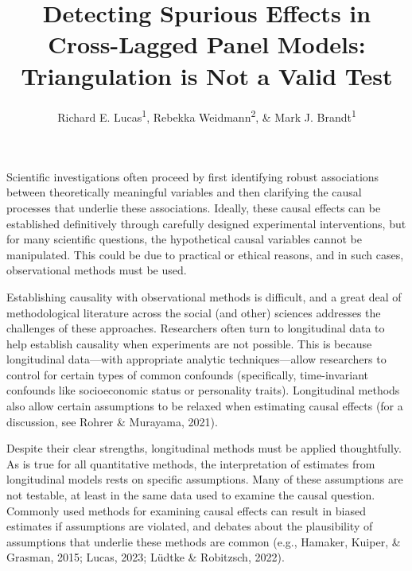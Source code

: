 \documentclass[
  man,mask,floatsintext]{apa6}
\title{Detecting Spurious Effects in Cross-Lagged Panel Models: Triangulation is Not a Valid Test}
\author{Richard E. Lucas\textsuperscript{1}, Rebekka Weidmann\textsuperscript{2}, \& Mark J. Brandt\textsuperscript{1}}
\date{}
\affiliation{\vspace{0.5cm}\textsuperscript{1} Department of Psychology, Michigan State University\\\textsuperscript{2} Department of Psychology, Brigham Young University}
\begin{document}
\maketitle

Scientific investigations often proceed by first identifying robust associations between theoretically meaningful variables and then clarifying the causal processes that underlie these associations. Ideally, these causal effects can be established definitively through carefully designed experimental interventions, but for many scientific questions, the hypothetical causal variables cannot be manipulated. This could be due to practical or ethical reasons, and in such cases, observational methods must be used.

Establishing causality with observational methods is difficult, and a great deal of methodological literature across the social (and other) sciences addresses the challenges of these approaches. Researchers often turn to longitudinal data to help establish causality when experiments are not possible. This is because longitudinal data---with appropriate analytic techniques---allow researchers to control for certain types of common confounds (specifically, time-invariant confounds like socioeconomic status or personality traits). Longitudinal methods also allow certain assumptions to be relaxed when estimating causal effects (for a discussion, see Rohrer \& Murayama, 2021).

Despite their clear strengths, longitudinal methods must be applied thoughtfully. As is true for all quantitative methods, the interpretation of estimates from longitudinal models rests on specific assumptions. Many of these assumptions are not testable, at least in the same data used to examine the causal question. Commonly used methods for examining causal effects can result in biased estimates if assumptions are violated, and debates about the plausibility of assumptions that underlie these methods are common (e.g., Hamaker, Kuiper, \& Grasman, 2015; Lucas, 2023; Lüdtke \& Robitzsch, 2022).
\end{document}
